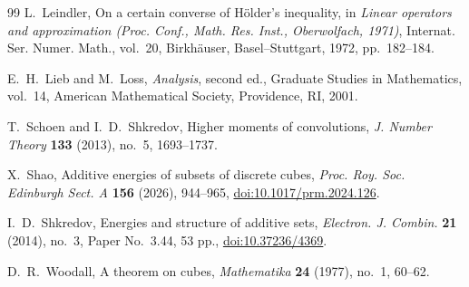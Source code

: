 \documentclass[11pt,reqno]{amsart}
\numberwithin{equation}{section}
\theoremstyle{definition}
\theoremstyle{remark}
\begin{document}
\begin{thebibliography}{99}
L.~Leindler,
\newblock On a certain converse of H\"older's inequality,
\newblock in \emph{Linear operators and approximation (Proc. Conf., Math. Res. Inst., Oberwolfach, 1971)},
\newblock Internat. Ser. Numer. Math., vol.~20, Birkh\"auser, Basel--Stuttgart, 1972, pp.~182--184.

E.~H.~Lieb and M.~Loss,
\newblock \emph{Analysis}, second ed.,
\newblock Graduate Studies in Mathematics, vol.~14, American Mathematical Society, Providence, RI, 2001.

T.~Schoen and I.~D.~Shkredov,
\newblock Higher moments of convolutions,
\newblock \emph{J. Number Theory} \textbf{133} (2013), no.~5, 1693--1737.

X.~Shao,
\newblock Additive energies of subsets of discrete cubes,
\newblock \emph{Proc. Roy. Soc. Edinburgh Sect. A} \textbf{156} (2026), 944--965,
\newblock \href{https://doi.org/10.1017/prm.2024.126}{doi:10.1017/prm.2024.126}.

I.~D.~Shkredov,
\newblock Energies and structure of additive sets,
\newblock \emph{Electron. J. Combin.} \textbf{21} (2014), no.~3, Paper No.~3.44, 53 pp.,
\newblock \href{https://doi.org/10.37236/4369}{doi:10.37236/4369}.

D.~R.~Woodall,
\newblock A theorem on cubes,
\newblock \emph{Mathematika} \textbf{24} (1977), no.~1, 60--62.

\end{thebibliography}
\end{document}

